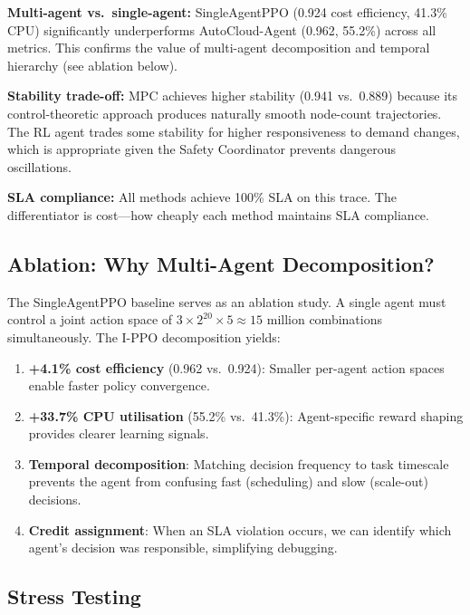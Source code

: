 \documentclass[conference]{IEEEtran}
\begin{document}
\textbf{Multi-agent vs.\ single-agent:} SingleAgentPPO (0.924 cost
efficiency, 41.3\% CPU) significantly underperforms AutoCloud-Agent (0.962,
55.2\%) across all metrics.  This confirms the value of multi-agent
decomposition and temporal hierarchy (see ablation below).

\textbf{Stability trade-off:} MPC achieves higher stability (0.941 vs.\
0.889) because its control-theoretic approach produces naturally smooth
node-count trajectories.  The RL agent trades some stability for higher
responsiveness to demand changes, which is appropriate given the Safety
Coordinator prevents dangerous oscillations.

\textbf{SLA compliance:} All methods achieve 100\% SLA on this trace.
The differentiator is cost---how cheaply each method maintains SLA compliance.

\subsection{Ablation: Why Multi-Agent Decomposition?}

The SingleAgentPPO baseline serves as an ablation study.  A single agent must
control a joint action space of $3 \times 2^{20} \times 5 \approx 15$ million
combinations simultaneously.  The I-PPO decomposition yields:
\begin{enumerate}[leftmargin=*]
  \item \textbf{+4.1\% cost efficiency} (0.962 vs.\ 0.924): Smaller per-agent
        action spaces enable faster policy convergence.
  \item \textbf{+33.7\% CPU utilisation} (55.2\% vs.\ 41.3\%): Agent-specific
        reward shaping provides clearer learning signals.
  \item \textbf{Temporal decomposition}: Matching decision frequency to task
        timescale prevents the agent from confusing fast (scheduling) and slow
        (scale-out) decisions.
  \item \textbf{Credit assignment}: When an SLA violation occurs, we can
        identify which agent's decision was responsible, simplifying debugging.
\end{enumerate}

\subsection{Stress Testing}
\end{document}
